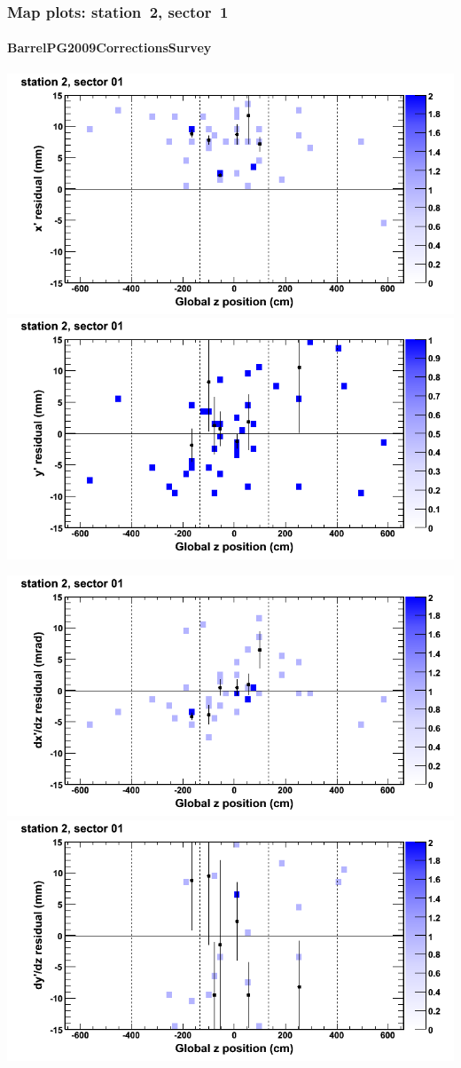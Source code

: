 \documentclass[compress]{beamer}
\begin{document}
\begin{frame}
\frametitle{Map plots: station~2, sector~1}
\framesubtitle{BarrelPG2009CorrectionsSurvey}
\includegraphics[width=0.5\linewidth]{mapplots_01/DTvsz_st2sec01_x.png}
\includegraphics[width=0.5\linewidth]{mapplots_01/DTvsz_st2sec01_y.png}

\includegraphics[width=0.5\linewidth]{mapplots_01/DTvsz_st2sec01_dxdz.png}
\includegraphics[width=0.5\linewidth]{mapplots_01/DTvsz_st2sec01_dydz.png}
\end{frame}
\end{document}
